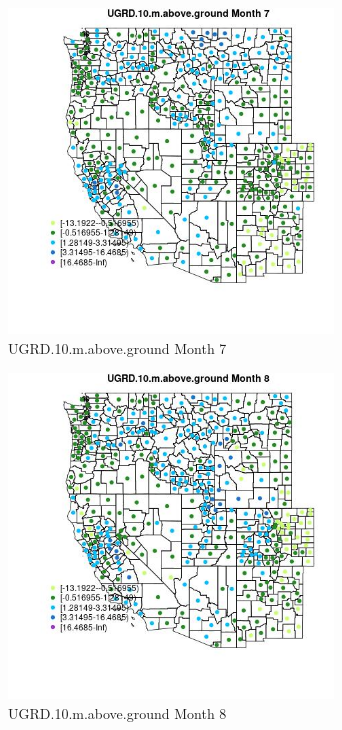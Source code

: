 \begin{figure} 
\centering  
\includegraphics[width=0.77\textwidth]{Code_Outputs/df_report_ML_predictors_CountyCentroid_Locations_Dates_2008-01-01to2018-12-31_MapObsMo7UGRD10maboveground.jpg} 
\caption{\label{fig:df_report_ML_predictors_CountyCentroid_Locations_Dates_2008-01-01to2018-12-31MapObsMo7UGRD10maboveground}UGRD.10.m.above.ground Month 7} 
\end{figure} 
 

\begin{figure} 
\centering  
\includegraphics[width=0.77\textwidth]{Code_Outputs/df_report_ML_predictors_CountyCentroid_Locations_Dates_2008-01-01to2018-12-31_MapObsMo8UGRD10maboveground.jpg} 
\caption{\label{fig:df_report_ML_predictors_CountyCentroid_Locations_Dates_2008-01-01to2018-12-31MapObsMo8UGRD10maboveground}UGRD.10.m.above.ground Month 8} 
\end{figure} 
 

